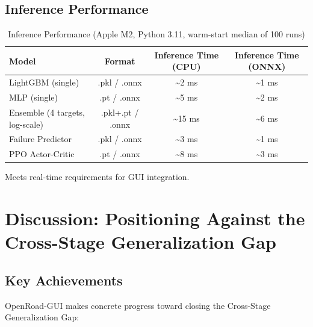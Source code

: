 \documentclass[10pt,conference]{IEEEtran}
\begin{document}
\begin{table}[t]
\subsection{Inference Performance}

\begin{table}[t]
\centering
\caption{Inference Performance (Apple M2, Python 3.11, warm-start median of 100 runs)}
\label{tab:inference_perf}
\begin{tabular}{@{}lccc@{}}
\toprule
Model & Format & Inference Time (CPU) & Inference Time (ONNX) \\
\midrule
LightGBM (single) & .pkl / .onnx & \textasciitilde 2 ms & \textasciitilde 1 ms \\
MLP (single) & .pt / .onnx & \textasciitilde 5 ms & \textasciitilde 2 ms \\
Ensemble (4 targets, log-scale) & .pkl+.pt / .onnx & \textasciitilde 15 ms & \textasciitilde 6 ms \\
Failure Predictor & .pkl / .onnx & \textasciitilde 3 ms & \textasciitilde 1 ms \\
PPO Actor-Critic & .pt / .onnx & \textasciitilde 8 ms & \textasciitilde 3 ms \\
\bottomrule
\end{tabular}
\end{table}

Meets real-time requirements for GUI integration.


\section{Discussion: Positioning Against the Cross-Stage Generalization Gap}
\label{sec:discussion}

\subsection{Key Achievements}

OpenRoad-GUI makes concrete progress toward closing the Cross-Stage Generalization Gap:


\end{table}
\end{document}
